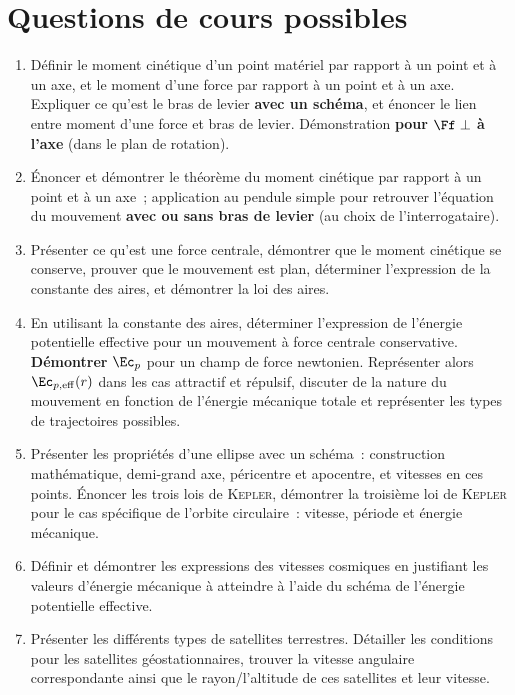 \documentclass[a4paper, 12pt, final, garamond]{book}
\begin{document}
\newpage

\section{Questions de cours possibles}
\begin{enumerate}
	\item Définir le moment cinétique d'un point matériel par rapport à un point
	      et à un axe, et le moment d'une force par rapport à un point et à un
	      axe. Expliquer ce qu'est le bras de levier \textbf{avec un schéma}, et
	      énoncer le lien entre moment d'une force et bras de levier.
	      Démonstration \textbf{pour $\Ff \perp$ à l'axe} (dans le plan de
	      rotation).
	\item Énoncer et démontrer le théorème du moment cinétique par rapport à un
	      point et à un axe~; application au pendule simple pour retrouver
	      l'équation du mouvement \textbf{avec ou sans bras de levier} (au choix
	      de l'interrogataire).

  \item Présenter ce qu'est une force centrale, démontrer que le moment
      cinétique se conserve, prouver que le mouvement est plan, déterminer
      l'expression de la constante des aires, et démontrer la loi des aires.
  \item En utilisant la constante des aires, déterminer l'expression de
      l'énergie potentielle effective pour un mouvement à force centrale
      conservative. \textbf{Démontrer} $\Ec_p$ pour un champ de force
      newtonien. Représenter alors $\Ec_{p,\rm eff}(r)$ dans les cas attractif
      et répulsif, discuter de la nature du mouvement en fonction de
      l'énergie mécanique totale et représenter les types de trajectoires
      possibles.
  \item Présenter les propriétés d'une ellipse avec un schéma~: construction
      mathématique, demi-grand axe, péricentre et apocentre, et vitesses en ces
      points. Énoncer les trois lois de \textsc{Kepler}, démontrer la troisième
      loi de \textsc{Kepler} pour le cas spécifique de l'orbite circulaire~:
      vitesse, période et énergie mécanique.
  \item Définir et démontrer les expressions des vitesses cosmiques en
      justifiant les valeurs d'énergie mécanique à atteindre à l'aide du
      schéma de l'énergie potentielle effective.
  \item Présenter les différents types de satellites terrestres. Détailler les
    conditions pour les satellites géostationnaires, trouver la vitesse
    angulaire correspondante ainsi que le rayon/l'altitude de ces satellites
    et leur vitesse.


\end{enumerate}
\end{document}
